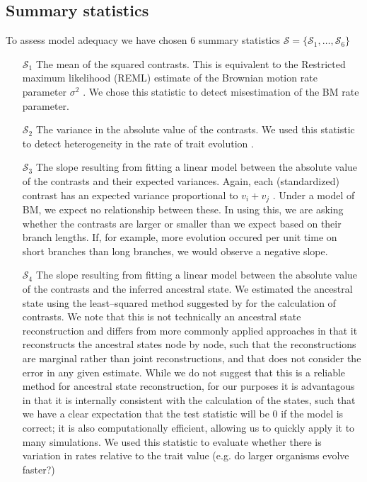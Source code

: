 \documentclass[a4paper,12pt]{article}
\begin{document}
\subsection*{Summary statistics}

To assess model adequacy we have chosen 6 summary statistics $\mathcal{S} = \lbrace \mathcal{S}_1, \ldots, \mathcal{S}_6 \rbrace$

\begin{enumerate}
\item[$\mathcal{S}_1$] The mean of the squared contrasts. This is equivalent to the Restricted maximum likelihood (REML) estimate of the Brownian motion rate parameter $\sigma^2$ \citep{Garland1992, Rohlf2001}. We chose this statistic to detect misestimation of the BM rate parameter.

\item[$\mathcal{S}_2$] The variance in the absolute value of the contrasts. We used this statistic to detect heterogeneity in the rate of trait evolution \citep[\textit{sensu}][]{Omeara2006, Eastman2011}.

\item[$\mathcal{S}_3$] The slope resulting from fitting a linear model between the absolute value of the contrasts and their expected variances. Again, each (standardized) contrast has an expected variance proportional to $v_i + v_j$  \citep{Felsenstein1985}. Under a model of BM, we expect no relationship between these. In using this, we are asking whether the contrasts are larger or smaller than we expect based on their branch lengths. If, for example, more evolution occured per unit time on short branches than long branches, we would observe a negative slope.

\item[$\mathcal{S}_4$] The slope resulting from fitting a linear model between the absolute value of the contrasts and the inferred ancestral state. We estimated the ancestral state using the least--squared method suggested by \citep{Felsenstein1985} for the calculation of contrasts. We note that this is not technically an ancestral state reconstruction and differs from more commonly applied approaches \citep[such as the  maximum likelihood estimator][]{Schluter1997} in that it reconstructs the ancestral states node by node, such that the reconstructions are marginal rather than joint reconstructions, and that does not consider the error in any given estimate. While we do not suggest that this is a reliable method for ancestral state reconstruction, for our purposes it is advantagous in that it is internally consistent with the calculation of the states, such that we have a clear expectation that the test statistic will be 0 if the model is correct; it is also computationally efficient, allowing us to quickly apply it to many simulations. We used this statistic to evaluate whether there is variation in rates relative to the trait value (e.g. do larger organisms evolve faster?)


\end{enumerate}
\end{document}
